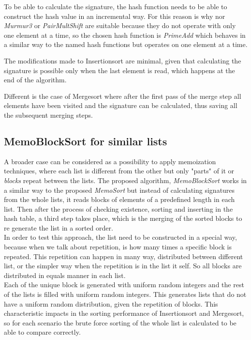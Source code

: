 \documentclass[a4paper,12pt]{article}
\begin{document}
To be able to calculate the signature, the hash function needs to be able to construct the hash value in an incremental way. For this reason is why nor {\it Murmur3} or {\it PairMultShift}  are suitable because they do not operate with only one element at a time, so the chosen hash function is {\it PrimeAdd} which behaves in a similar way to the named hash functions but operates on one element at a time.

The modifications made to Insertionsort are minimal, given that calculating the signature is possible only when the last element is read, which happens at the end of the algorithm.

Different is the case of Mergesort where after the first pass of the merge step all elements have been visited and the signature can be calculated, thus saving all the subsequent merging steps.

\subsection{MemoBlockSort for similar lists} \label{MemoBlockSort}
A broader case can be considered as a possibility to apply memoization techniques, where each list is different from the other but only "parts" of it or {\it blocks} repeat between the lists. The proposed algorithm, {\it MemoBlockSort} works in a similar way to the proposed  {\it MemoSort} but instead of calculating signatures from the whole lists, it reads blocks of elements of a predefined length in each list. Then after the process of checking existence, sorting and inserting in the hash table, a third step takes place, which is the merging of the sorted blocks to re generate the list in a sorted order.\\

In order to test this approach, the list need to be constructed in a special way, because when we talk about repetition, is how many times a specific block is repeated. This repetition can happen in many way, distributed between different list, or the simpler way when the repetition is in the list it self. So all blocks are distributed in equals manner in each list.\\

Each of the unique block is generated with uniform random integers and the rest of the lists is filled with uniform random integers. This generates lists that do not have a uniform random distribution, given the repetition of blocks. This characteristic impacts in the sorting performance of Insertionsort and Mergesort, so for each scenario the brute force sorting of the whole list is calculated to be able to compare correctly. 
\end{document}
